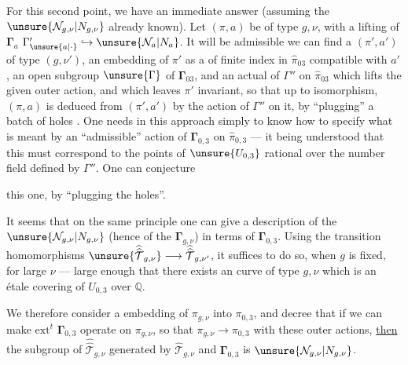 
For this second point, we have an immediate answer (assuming the
$\unsure{\mathcal{N}_{g,\nu}|N_{g,\nu}}$ already known). Let  $(\pi,a)$ be of type $g,\nu$,
with  a  lifting of $\boldsymbol{\Gamma}_a$ 
$\Gamma'_{\unsure{a|\cdot}}\hookrightarrow \unsure{\mathcal{N}_a|N_a}$.
It will be admissible  we can find
a $(\pi',a')$ of type $(g,\nu')$,  an
embedding of $\pi'$ as a  of finite index in $\widehat{\pi}_{03}$ compatible with $a'$,
 an open subgroup $\unsure{\Gamma}$  of $\boldsymbol{\Gamma}_{03}$, and
an  actual  of $\Gamma''$ 
on $\widehat{\pi}_{03}$ which
lifts the given outer action, and which
leaves $\pi'$ invariant, so that up to isomorphism,
$(\pi,a)$ 
is deduced from $(\pi',a')$
by the action of $\Gamma''$ on it, by ``plugging''
a batch of holes . One needs
in this approach simply to know how to
specify  what is meant by
an ``admissible'' action of  $\boldsymbol{\Gamma}_{0,3}$ on $\widehat{\pi}_{0,3}$
--- it being understood that this must correspond
to the points of $\unsure{U_{0,3}}$ rational over  the number
field defined by $\Gamma''$. One can conjecture



this one, by ``plugging the holes''.

It seems that on the same
principle one can give a description of the
$\unsure{\mathcal{N}_{g,\nu}|N_{g,\nu}}$ (hence of the $\boldsymbol{\Gamma}_{g,\nu}$)
in terms of
$\boldsymbol{\Gamma}_{0,3}$. Using the transition homomorphisms
$\unsure{\widehat{\widehat{\mathcal{T}}}_{g,\nu}}
\longrightarrow
\widehat{\widehat{\mathcal{T}}}_{g,\nu'}$,
it suffices to
do so, when $g$ is fixed, for large
$\nu$ --- large enough that there
exists an  curve of type $g,\nu$ 
which is an étale covering of $U_{0,3}$ over $\mathbb{Q}$.

We therefore consider a  embedding
of $\pi_{g,\nu}$ into $\pi_{0,3}$, and
decree that if  we can make
$\mathrm{ext}^{t}$ $\boldsymbol{\Gamma}_{0,3}$ operate on $\pi_{g,\nu}$, so
that $\pi_{g,\nu}\longrightarrow\pi_{0,3}$ 
with these outer actions, \uline{then} the subgroup
of $\widehat{\widehat{\mathcal{T}}}_{g,\nu}$ generated by
$\widehat{\mathcal{T}}_{g,\nu}$ and
$\boldsymbol{\Gamma}_{0,3}$ is 
$\unsure{\mathcal{N}_{g,\nu}|N_{g,\nu}}$.

